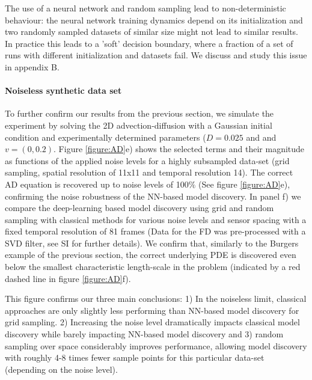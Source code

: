 \documentclass{article} %
\begin{document}

The use of a neural network and random sampling lead to non-deterministic behaviour: the neural network training dynamics depend on its initialization and two randomly sampled datasets of similar size might not lead to similar results. In practice this leads to a 'soft' decision boundary, where a fraction of a set of runs with different initialization and datasets fail. We discuss and study this issue in appendix B.



\paragraph{Noiseless synthetic data set} 

To further confirm our results from the previous section, we simulate the experiment by solving the 2D advection-diffusion with a Gaussian initial condition and experimentally determined parameters ($D = 0.025$ and and $v = (0, 0.2)$. Figure \ref{figure:AD}e) shows the selected terms and their magnitude as functions of the applied noise levels for a highly subsampled data-set (grid sampling, spatial resolution of 11x11 and temporal resolution 14). The correct AD equation is recovered up to noise levels of 100$\%$ (See figure \ref{figure:AD}e), confirming the noise robustness of the NN-based model discovery. In panel f) we compare the deep-learning based model discovery using grid and random sampling with classical methods for various noise levels and sensor spacing with a fixed temporal resolution of 81 frames (Data for the FD was pre-processed with a SVD filter, see SI for further details). We confirm that, similarly to the Burgers example of the previous section, the correct underlying PDE is discovered even below the smallest characteristic length-scale in the problem (indicated by a red dashed line in figure \ref{figure:AD}f).

This figure confirms our three main conclusions: 1) In the noiseless limit, classical approaches are only slightly less performing than NN-based model discovery for grid sampling. 2) Increasing the noise level dramatically impacts classical model discovery while barely impacting NN-based model discovery and 3) random sampling over space considerably improves performance, allowing model discovery with roughly 4-8 times fewer sample points for this particular data-set (depending on the noise level). 
\end{document}
